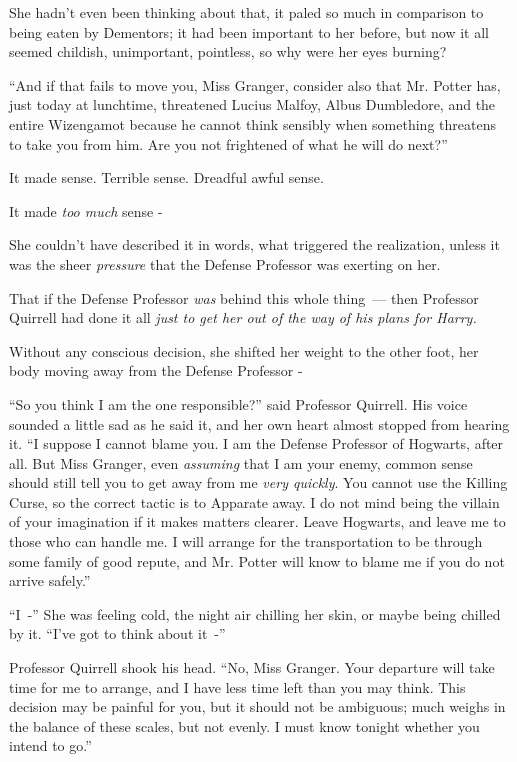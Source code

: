 She hadn't even been thinking about that, it paled so much in comparison to being eaten by Dementors; it had been important to her before, but now it all seemed childish, unimportant, pointless, so why were her eyes burning?

``And if that fails to move you, Miss Granger, consider also that Mr. Potter has, just today at lunchtime, threatened Lucius Malfoy, Albus Dumbledore, and the entire Wizengamot because he cannot think sensibly when something threatens to take you from him. Are you not frightened of what he will do next?''

It made sense. Terrible sense. Dreadful awful sense.

It made \emph{too much} sense -

She couldn't have described it in words, what triggered the realization, unless it was the sheer \emph{pressure} that the Defense Professor was exerting on her.

That if the Defense Professor \emph{was} behind this whole thing~--- then Professor Quirrell had done it all \emph{just to get her out of the way of his plans for Harry.}

Without any conscious decision, she shifted her weight to the other foot, her body moving away from the Defense Professor -

``So you think I am the one responsible?'' said Professor Quirrell. His voice sounded a little sad as he said it, and her own heart almost stopped from hearing it. ``I suppose I cannot blame you. I am the Defense Professor of Hogwarts, after all. But Miss Granger, even \emph{assuming} that I am your enemy, common sense should still tell you to get away from me \emph{very quickly}. You cannot use the Killing Curse, so the correct tactic is to Apparate away. I do not mind being the villain of your imagination if it makes matters clearer. Leave Hogwarts, and leave me to those who can handle me. I will arrange for the transportation to be through some family of good repute, and Mr. Potter will know to blame me if you do not arrive safely.''

``I~-'' She was feeling cold, the night air chilling her skin, or maybe being chilled by it. ``I've got to think about it~-''

Professor Quirrell shook his head. ``No, Miss Granger. Your departure will take time for me to arrange, and I have less time left than you may think. This decision may be painful for you, but it should not be ambiguous; much weighs in the balance of these scales, but not evenly. I must know tonight whether you intend to go.''

